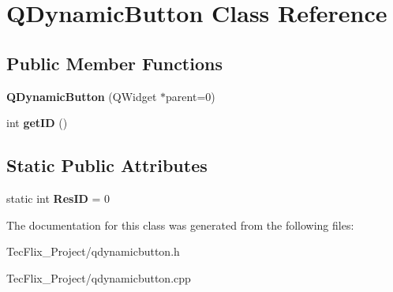 \hypertarget{classQDynamicButton}{}\section{Q\+Dynamic\+Button Class Reference}
\label{classQDynamicButton}
\subsection*{Public Member Functions}
\begin{DoxyCompactItemize}
\item 
\mbox{\label{classQDynamicButton_a6a38ffdb0071bae9743aee2cc28fb160}} 
{\bfseries Q\+Dynamic\+Button} (Q\+Widget $\ast$parent=0)
\item 
\mbox{\label{classQDynamicButton_a2c95c0cddab80f4d59cf737f39b1c683}} 
int {\bfseries get\+ID} ()
\end{DoxyCompactItemize}
\subsection*{Static Public Attributes}
\begin{DoxyCompactItemize}
\item 
\mbox{\label{classQDynamicButton_ac0d434bcddca0b966e358941caccaf77}} 
static int {\bfseries Res\+ID} = 0
\end{DoxyCompactItemize}


The documentation for this class was generated from the following files\+:\begin{DoxyCompactItemize}
\item 
Tec\+Flix\+\_\+\+Project/qdynamicbutton.\+h\item 
Tec\+Flix\+\_\+\+Project/qdynamicbutton.\+cpp\end{DoxyCompactItemize}
